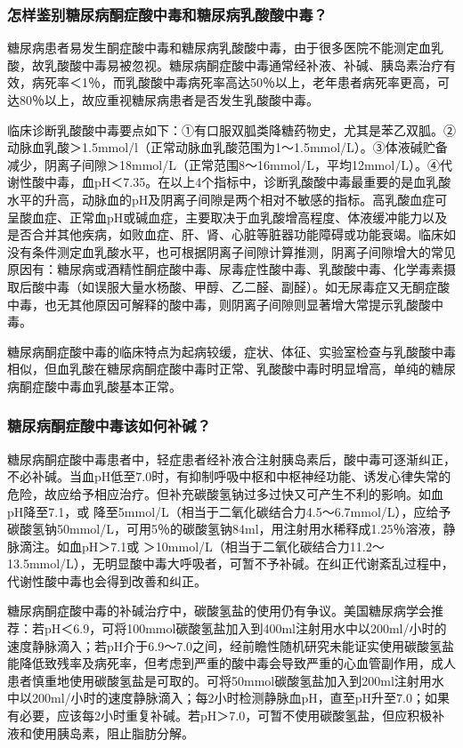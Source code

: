\subsubsection{怎样鉴别糖尿病酮症酸中毒和糖尿病乳酸酸中毒？}

糖尿病患者易发生酮症酸中毒和糖尿病乳酸酸中毒，由于很多医院不能测定血乳酸，故乳酸酸中毒易被忽视。糖尿病酮症酸中毒通常经补液、补碱、胰岛素治疗有效，病死率＜1％，而乳酸酸中毒病死率高达50％以上，老年患者病死率更高，可达80％以上，故应重视糖尿病患者是否发生乳酸酸中毒。

临床诊断乳酸酸中毒要点如下：①有口服双胍类降糖药物史，尤其是苯乙双胍。②动脉血乳酸＞1.5mmol/l（正常动脉血乳酸范围为1～1.5mmol/L）。③体液碱贮备减少，阴离子间隙＞18mmol/L（正常范围8～16mmol/L，平均12mmol/L）。④代谢性酸中毒，血pH＜7.35。在以上4个指标中，诊断乳酸酸中毒最重要的是血乳酸水平的升高，动脉血的pH及阴离子间隙是两个相对不敏感的指标。高乳酸血症可呈酸血症、正常血pH或碱血症，主要取决于血乳酸增高程度、体液缓冲能力以及是否合并其他疾病，如败血症、肝、肾、心脏等脏器功能障碍或功能衰竭。临床如没有条件测定血乳酸水平，也可根据阴离子间隙计算推测，阴离子间隙增大的常见原因有：糖尿病或酒精性酮症酸中毒、尿毒症性酸中毒、乳酸酸中毒、化学毒素摄取后酸中毒（如误服大量水杨酸、甲醇、乙二醛、副醛）。如无尿毒症又无酮症酸中毒，也无其他原因可解释的酸中毒，则阴离子间隙则显著增大常提示乳酸酸中毒。

糖尿病酮症酸中毒的临床特点为起病较缓，症状、体征、实验室检查与乳酸酸中毒相似，但血乳酸在糖尿病酮症酸中毒时正常、乳酸酸中毒时明显增高，单纯的糖尿病酮症酸中毒血乳酸基本正常。

\subsubsection{糖尿病酮症酸中毒该如何补碱？}

糖尿病酮症酸中毒患者中，轻症患者经补液合注射胰岛素后，酸中毒可逐渐纠正，不必补碱。当血pH低至7.0时，有抑制呼吸中枢和中枢神经功能、诱发心律失常的危险，故应给予相应治疗。但补充碳酸氢钠过多过快又可产生不利的影响。如血pH降至7.1，或
降至5mmol/L（相当于二氧化碳结合力4.5～6.7mmol/L），应给予碳酸氢钠50mmol/L，可用5％的碳酸氢钠84ml，用注射用水稀释成1.25％溶液，静脉滴注。如血pH＞7.1或
＞10mmol/L（相当于二氧化碳结合力11.2～13.5mmol/L），无明显酸中毒大呼吸者，可暂不予补碱。在纠正代谢紊乱过程中，代谢性酸中毒也会得到改善和纠正。

糖尿病酮症酸中毒的补碱治疗中，碳酸氢盐的使用仍有争议。美国糖尿病学会推荐：若pH＜6.9，可将100mmol碳酸氢盐加入到400ml注射用水中以200ml/小时的速度静脉滴入；若pH介于6.9～7.0之间，经前瞻性随机研究未能证实使用碳酸氢盐能降低致残率及病死率，但考虑到严重的酸中毒会导致严重的心血管副作用，成人患者慎重地使用碳酸氢盐是可取的。可将50mmol碳酸氢盐加入到200ml注射用水中以200ml/小时的速度静脉滴入；每2小时检测静脉血pH，直至pH升至7.0；如果有必要，应该每2小时重复补碱。若pH＞7.0，可暂不使用碳酸氢盐，但应积极补液和使用胰岛素，阻止脂肪分解。

